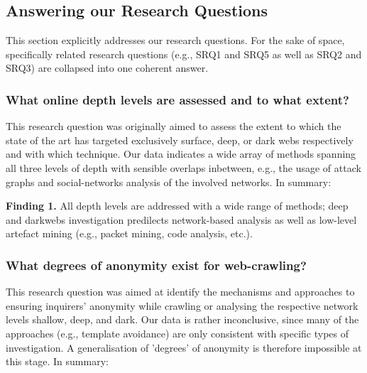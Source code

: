 \subsection{Answering our Research Questions}

This section explicitly addresses our research questions. For the sake of space, specifically related research questions (e.g., SRQ1 and SRQ5 as well as SRQ2 and SRQ3) are collapsed into one coherent answer.

\subsubsection{What online depth levels are assessed and to what extent?}

This research question was originally aimed to assess the extent to which the state of the art has targeted exclusively surface, deep, or dark webs respectively and with which technique. Our data indicates a wide array of methods spanning all three levels of depth with sensible overlaps inbetween, e.g., the usage of attack graphs and social-networks analysis of the involved networks. In summary:

\begin{framed}
\textbf{Finding 1.} All depth levels are addressed with a wide range of methods; deep and darkwebs investigation predilects network-based analysis as well as low-level artefact mining (e.g., packet mining, code analysis, etc.).
\end{framed}

\subsubsection{What degrees of anonymity exist for web-crawling?}

This research question was aimed at identify the mechanisms and approaches to ensuring inquirers' anonymity while crawling or analysing the respective network levels shallow, deep, and dark. Our data is rather inconclusive, since many of the approaches (e.g., template avoidance) are only consistent with specific types of investigation. A generalisation of 'degrees' of anonymity is therefore impossible at this stage. In summary:

